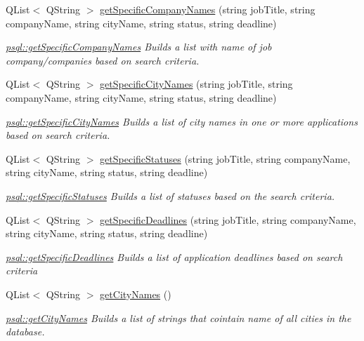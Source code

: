 \begin{DoxyCompactItemize}
Q\+List$<$ Q\+String $>$ \hyperlink{classpsql_a47a1c719a9014f94706fdce665fdf21c}{get\+Specific\+Company\+Names} (string job\+Title, string company\+Name, string city\+Name, string status, string deadline)
\begin{DoxyCompactList}\small\item\em \hyperlink{classpsql_a47a1c719a9014f94706fdce665fdf21c}{psql\+::get\+Specific\+Company\+Names} Builds a list with name of job company/companies based on search criteria. \end{DoxyCompactList}\item 
Q\+List$<$ Q\+String $>$ \hyperlink{classpsql_ae337317b29abd16f3a52467d978b04ea}{get\+Specific\+City\+Names} (string job\+Title, string company\+Name, string city\+Name, string status, string deadline)
\begin{DoxyCompactList}\small\item\em \hyperlink{classpsql_ae337317b29abd16f3a52467d978b04ea}{psql\+::get\+Specific\+City\+Names} Builds a list of city names in one or more applications based on search criteria. \end{DoxyCompactList}\item 
Q\+List$<$ Q\+String $>$ \hyperlink{classpsql_a7635c79a1991c8271c813dbf02f7d123}{get\+Specific\+Statuses} (string job\+Title, string company\+Name, string city\+Name, string status, string deadline)
\begin{DoxyCompactList}\small\item\em \hyperlink{classpsql_a7635c79a1991c8271c813dbf02f7d123}{psql\+::get\+Specific\+Statuses} Builds a list of statuses based on the search criteria. \end{DoxyCompactList}\item 
Q\+List$<$ Q\+String $>$ \hyperlink{classpsql_a880551e9e539e52143a35dee2b07bff6}{get\+Specific\+Deadlines} (string job\+Title, string company\+Name, string city\+Name, string status, string deadline)
\begin{DoxyCompactList}\small\item\em \hyperlink{classpsql_a880551e9e539e52143a35dee2b07bff6}{psql\+::get\+Specific\+Deadlines} Builds a list of application deadlines based on search criteria \end{DoxyCompactList}\item 
Q\+List$<$ Q\+String $>$ \hyperlink{classpsql_a42ee0cf90055ba6a7a6f564cf04d8bb8}{get\+City\+Names} ()
\begin{DoxyCompactList}\small\item\em \hyperlink{classpsql_a42ee0cf90055ba6a7a6f564cf04d8bb8}{psql\+::get\+City\+Names} Builds a list of strings that cointain name of all cities in the database. \end{DoxyCompactList}\item 

\end{DoxyCompactItemize}
